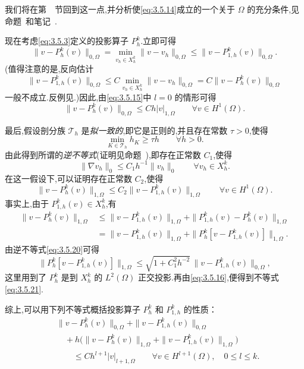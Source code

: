 我们将在第~~节回到这一点,并分析使\eqref{eq:3.5.14}成立的一个关于 \(\Omega\) 的充分条件,见命题~和笔记~.

现在考虑\eqref{eq:3.5.3}定义的投影算子 \(P_h^k\).立即可得
\begin{equation}\label{eq:3.5.17}
  \|v-P_h^k(v)\|_{0,\Omega}=\min_{v_h\in X_h^k}\|v-v_h\|_{0,\Omega}
  \le\|v-P_{1,h}^k(v)\|_{0,\Omega}.
\end{equation}
(值得注意的是,反向估计
\[
  \|v-P_{1,h}^k(v)\|_{0,\Omega}\le C\min_{v_h\in X_h^k}\|v-v_h\|_{0,\Omega}
   =C\|v-P_h^k(v)\|_{0,\Omega}
\]
一般不成立.反例见.)因此,由\eqref{eq:3.5.15}中 \(l=0\) 的情形可得
\begin{equation}\label{eq:3.5.18}
  \|v-P_h^k(v)\|_{0,\Omega}\le Ch|v|_{1,\Omega}\qquad\forall v\in H^1(\Omega).
\end{equation}

最后,假设剖分族 \(\mathcal T_h\) 是\emph{拟一致的},即它是正则的,并且存在常数 \(\tau>0\),使得
\begin{equation}\label{eq:3.5.19}
  \min_{K\in\mathcal T_h}h_K\ge\tau h\qquad\forall h>0.
\end{equation}
由此得到所谓的\emph{逆不等式}(证明见命题~),即存在正常数 \(C_1\),使得
\begin{equation}\label{eq:3.5.20}
  \|\nabla v_h\|_0\le C_1h^{-1}\|v_h\|_0\qquad\forall v_h\in X_h^k.
\end{equation}
在这一假设下,可以证明存在正常数 \(C_2\),使得
\begin{equation}\label{eq:3.5.21}
  \|v-P_h^k(v)\|_{1,\Omega}\le C_2\|v-P_{1,h}^k(v)\|_{1,\Omega}
  \qquad\forall v\in H^1(\Omega).
\end{equation}
事实上,由于 \(P_{1,h}^k(v)\in X_h^k\),有
\[
  \begin{aligned}
    \|v-P_h^k(v)\|_{1,\Omega}
    &\le\|v-P_{1,h}^k(v)\|_{1,\Omega}
        +\|P_{1,h}^k(v)-P_h^k(v)\|_{1,\Omega}\\
    &=\|v-P_{1,h}^k(v)\|_{1,\Omega}
        +\|P_h^k[v-P_{1,h}^k(v)]\|_{1,\Omega}.
  \end{aligned}
\]
由逆不等式\eqref{eq:3.5.20}可得
\[
  \|P_h^k[v-P_{1,h}^k(v)]\|_{1,\Omega}
  \le\sqrt{1+C_1^2h^{-2}}\,\|v-P_{1,h}^k(v)\|_{0,\Omega},
\]
这里用到了 \(P_h^k\) 是到 \(X_h^k\) 的 \(L^2(\Omega)\) 正交投影.再由\eqref{eq:3.5.16},便得到不等式\eqref{eq:3.5.21}.

综上,可以用下列不等式概括投影算子 \(P_h^k\) 和 \(P_{1,h}^k\) 的性质：
\begin{equation}\label{eq:3.5.22}
  \begin{aligned}
    &\|v-P_h^k(v)\|_{0,\Omega}+\|v-P_{1,h}^k(v)\|_{0,\Omega}\\
    &\quad+h\bigl(\|v-P_h^k(v)\|_{1,\Omega}+\|v-P_{1,h}^k(v)\|_{1,\Omega}\bigr)\\
    &\qquad\le Ch^{l+1}|v|_{l+1,\Omega}
      \qquad\forall v\in H^{l+1}(\Omega),\quad 0\le l\le k.
  \end{aligned}
\end{equation}

